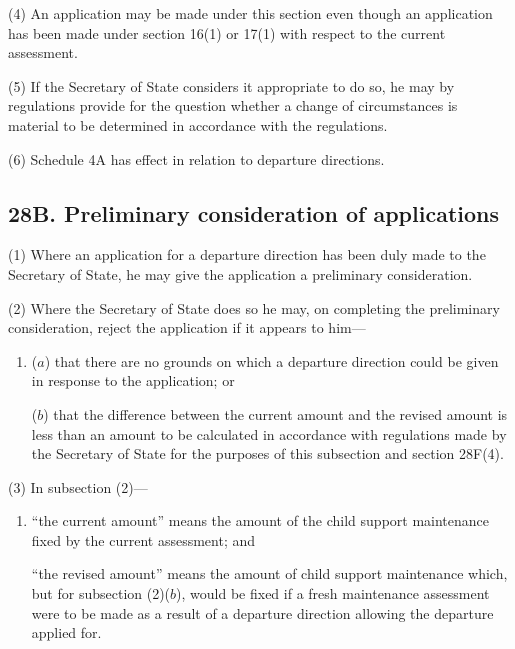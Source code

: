 \documentclass[12pt,a4paper]{article}
\begin{document}
%

(4) An application may be made under this section even though an application has been made under section 16(1) or 17(1) with respect to the current assessment.

(5) If the Secretary of State considers it appropriate to do so, he may by regulations provide for the question whether a change of circumstances is material to be determined in accordance with the regulations.

(6) Schedule 4A has effect in relation to departure directions.


\subsection{28B. Preliminary consideration of applications}

(1) Where an application for a departure direction has been duly made to the Secretary of State, he may give the application a preliminary consideration.

(2) Where the Secretary of State does so he may, on completing the preliminary consideration, reject the application if it appears to him—
\begin{enumerate}\item[]
($a$) that there are no grounds on which a departure direction could be given in response to the application; or

($b$) that the difference between the current amount and the revised amount is less than an amount to be calculated in accordance with regulations made by the Secretary of State for the purposes of this subsection and section 28F(4).
\end{enumerate}

(3) In subsection (2)—
\begin{enumerate}\item[]
    “the current amount” means the amount of the child support maintenance fixed by the current assessment; and

    “the revised amount” means the amount of child support maintenance which, but for subsection (2)($b$), would be fixed if a fresh maintenance assessment were to be made as a result of a departure direction allowing the departure applied for. 
\end{enumerate}
\end{document}

